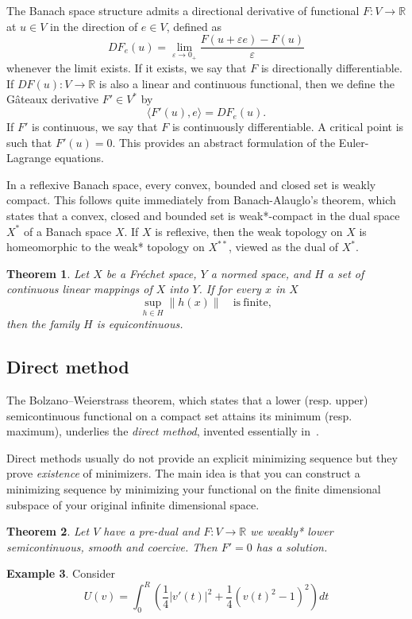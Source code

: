 \documentclass{article}
\theoremstyle{plain}
\newtheorem{teo}{Theorem}[section]
\theoremstyle{definition}
\newtheorem{exam}[teo]{Example}
\numberwithin{equation}{section}
\newcommand{\R}{\ensuremath{\mathbb{R}}}
\begin{document}
The Banach space structure admits a directional derivative of functional $F:V\to\R$ at $u\in V$ in the direction of $e\in V$, defined as
\[
DF_e(u) = \lim_{\varepsilon\to 0_+}\frac{F(u+\varepsilon e)-F(u)}{\varepsilon}
\]
whenever the limit exists. If it exists, we say that $F$ is directionally differentiable. If $DF(u):V\to\R$ is also a linear and continuous functional, then we define the Gâteaux derivative $F'\in V^*$ by
\[
\langle F'(u),e\rangle=DF_e(u).
\]
If $F'$ is  continuous, we say that $F$ is  continuously differentiable. A critical point is such that $F'(u)=0$. This provides an abstract formulation of the Euler-Lagrange equations.


In a reflexive Banach space, every convex, bounded and closed set is weakly compact. This follows quite immediately from Banach-Alauglo's theorem, which states that a convex, closed and bounded set is weak*-compact in the dual space $X^*$ of a Banach space $X$. If $X$ is reflexive, then the weak topology on $X$ is homeomorphic to the weak* topology on  $X^{**}$, viewed as the dual of $X^*$. 

\begin{teo}
Let $X$ be a Fréchet space, $Y$ a normed space, and $H$ a set of continuous linear mappings of $X$ into $Y$. If for every $x$ in $X$
\[
\sup_{h\in H} \|h(x)\|\quad\mathrm{is\ finite,}
\]
then the family $H$ is equicontinuous.
\end{teo}

\subsection{Direct method}
The Bolzano–Weierstrass theorem, which states that a lower (resp. upper) semicontinuous functional on a compact set attains its minimum (resp. maximum), underlies the \textit{direct method}, invented essentially in~\cite{tonelli1915methode}.

Direct methods usually do not provide an explicit minimizing sequence but they prove \textit{existence} of minimizers.  The main idea is that you can construct a minimizing sequence by minimizing your functional on the finite dimensional subspace of your original infinite dimensional space.

\begin{teo}
Let $V$ have a pre-dual and $F:V\to\R$ we weakly* lower semicontinuous, smooth and coercive. Then $F'=0$ has a solution.
\end{teo}

\begin{exam}
Consider
\[
U(v)=\int_0^R \left(\frac{1}{4}|v'(t)|^2+\frac{1}{4}(v(t)^2-1)^2\right)dt
\]
\end{exam}
\end{document}
